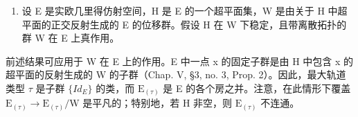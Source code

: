 \begin{enumerate}
\def\labelenumi{\arabic{enumi})}
\setcounter{enumi}{1}
\tightlist
\item
  设 E 是实欧几里得仿射空间，H 是 E 的一个超平面集，W 是由关于 H 中超平面的正交反射生成的 E 的位移群。假设 H 在 W 下稳定，且带离散拓扑的群 W 在 E 上真作用。
\end{enumerate}

前述结果可应用于 W 在 E 上的作用。E 中一点 x 的固定子群是由 H 中包含 x 的超平面的反射生成的 W 的子群（Chap. V, §3, no. 3, Prop. 2）。因此，最大轨道类型 \(\tau\) 是子群 \(\{Id_{E}\}\) 的类，而 \(\mathrm{E}_{(\tau)}\) 是 E 的各个房之并。注意，在此情形下覆盖 \(\mathrm{E}_{(\tau)} \to \mathrm{E}_{(\tau)}/\mathrm{W}\) 是平凡的；特别地，若 H 非空，则 \(\mathrm{E}_{(\tau)}\) 不连通。

